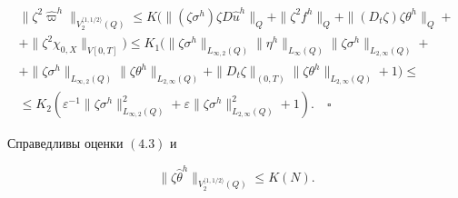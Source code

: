 \begin{multline*}


\|\zeta^2\widehat\varpi^h\|_{V_2^{\langle 1,1/2\rangle}(Q)}\le


K\big(\|(\zeta\sigma^h)\zeta D\widehat u^h\|_Q+\|\zeta^2 f^h\|_Q


+\|(D_t\zeta)\zeta\theta^h\|_Q+\\


+\|\zeta^2\chi_{0,X}\|_{V[0,T]}\big)\le


K_1(\|\zeta\sigma^h\|_{L_{\infty,2}(Q)}


\|\eta^h\|_{L_{\infty}(Q)}\|\zeta\sigma^h\|_{L_{2,\infty}(Q)}+\\


+\|\zeta\sigma^h\|_{L_{\infty,2}(Q)}\|\zeta\theta^h\|_{L_{2,\infty}(Q)}


+\|D_t\zeta\|_{(0,T)}\|\zeta\theta^h\|_{L_{2,\infty}(Q)}+1)\le\\


\le K_2(\varepsilon^{-1}\|\zeta\sigma^h\|^2_{L_{\infty,2}(Q)}+


\varepsilon\|\zeta\sigma^h\|^2_{L_{2,\infty}(Q)}+1).\quad\square


\end{multline*}





\begin{lems} Справедливы оценки $(4.3)$ и


\begin{equation}


\|\zeta\widehat\theta^h\|_{V_2^{\langle 1,1/2\rangle}(Q)}\le K(N).


\end{equation}


\end{lems}





